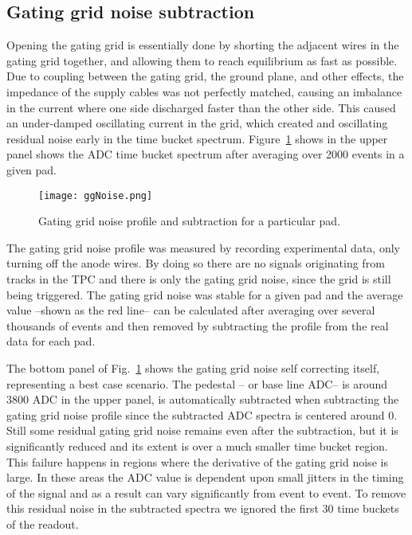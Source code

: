 \subsection{Gating grid noise subtraction}
\label{sec:ggnoisesub}
Opening the gating grid is essentially done by shorting the adjacent wires in the gating grid together, and allowing them to reach equilibrium as fast as possible. Due to coupling between the gating grid, the ground plane, and other effects, the impedance of the supply cables was not perfectly matched, causing an imbalance in the current where one side discharged faster than the other side. This caused an under-damped oscillating current in the grid, which created and  oscillating residual noise early in the time bucket spectrum. Figure~\ref{fig:ggNoiseSub} shows in the upper panel shows the ADC time bucket spectrum after averaging over 2000 events in a given pad. 
 
\begin{figure}[!htb]
\centering
\texttt{[image: ggNoise.png]}
\caption{Gating grid noise profile and subtraction for a particular pad.}
\label{fig:ggNoiseSub}
\end{figure}

The gating grid noise profile was measured by recording experimental data, only turning off the anode wires. By doing so there are no signals originating from tracks in the TPC and there is only the gating grid noise, since the grid is still being triggered. The gating grid noise was stable for a given pad and the average value --shown as the red line-- can be calculated after averaging over several thousands of events and then removed by subtracting the profile from the real data for each pad.

The bottom panel of Fig.~\ref{fig:ggNoiseSub} shows the gating grid noise self correcting itself, representing a best case scenario. The pedestal -- or base line ADC-- is around 3800 ADC in the upper panel, is automatically subtracted when subtracting the gating grid noise profile since the subtracted ADC spectra is centered around 0. Still some residual gating grid noise remains even after the subtraction, but it is significantly reduced and its extent is over a much smaller time bucket region. This failure happens in regions where the derivative of the gating grid noise is large. In these areas the ADC value is dependent upon small jitters in the timing of the signal and as a result can vary significantly from event to event. To remove this residual noise in the subtracted spectra we ignored the first 30 time buckets of the readout.

